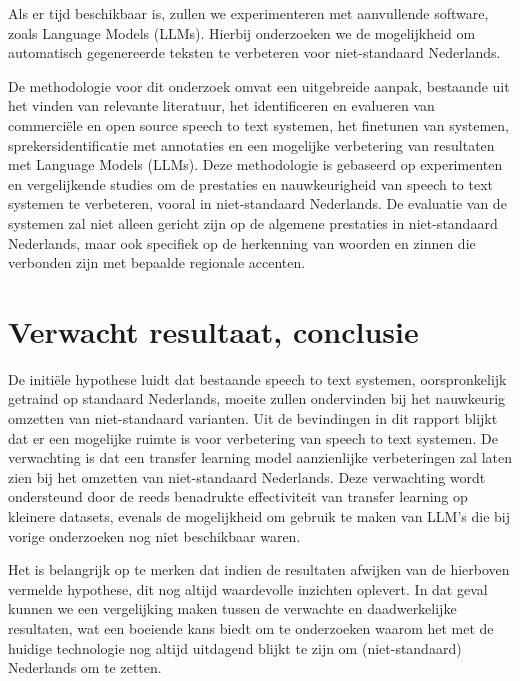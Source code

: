 \par Als er tijd beschikbaar is, zullen we experimenteren met aanvullende software, zoals Language Models (LLMs). Hierbij onderzoeken we de mogelijkheid om automatisch gegenereerde teksten te verbeteren voor niet-standaard Nederlands.


\par De methodologie voor dit onderzoek omvat een uitgebreide aanpak, bestaande uit het vinden van relevante literatuur, het identificeren en evalueren van commerciële en open source speech to text systemen, het finetunen van systemen, sprekersidentificatie met annotaties en een mogelijke verbetering van resultaten met Language Models (LLMs). Deze methodologie is gebaseerd op experimenten en vergelijkende studies om de prestaties en nauwkeurigheid van speech to text systemen te verbeteren, vooral in niet-standaard Nederlands. De evaluatie van de systemen zal niet alleen gericht zijn op de algemene prestaties in niet-standaard Nederlands, maar ook specifiek op de herkenning van woorden en zinnen die verbonden zijn met bepaalde regionale accenten.

\section{Verwacht resultaat, conclusie}%
\label{sec:verwachte_resultaten}

De initiële hypothese luidt dat bestaande speech to text systemen, oorspronkelijk getraind op standaard Nederlands, moeite zullen ondervinden bij het nauwkeurig omzetten van niet-standaard varianten.
Uit de bevindingen in dit rapport blijkt dat er een mogelijke ruimte is voor verbetering van speech to text systemen. De verwachting is dat een transfer learning model aanzienlijke verbeteringen zal laten zien bij het omzetten van niet-standaard Nederlands. Deze verwachting wordt ondersteund door de reeds benadrukte effectiviteit van transfer learning op kleinere datasets, evenals de mogelijkheid om gebruik te maken van LLM's die bij vorige onderzoeken nog niet beschikbaar waren.

Het is belangrijk op te merken dat indien de resultaten afwijken van de hierboven vermelde hypothese, dit nog altijd waardevolle inzichten oplevert. In dat geval kunnen we een vergelijking maken tussen de verwachte en daadwerkelijke resultaten, wat een boeiende kans biedt om te onderzoeken waarom het met de huidige technologie nog altijd uitdagend blijkt te zijn om (niet-standaard) Nederlands om te zetten.
